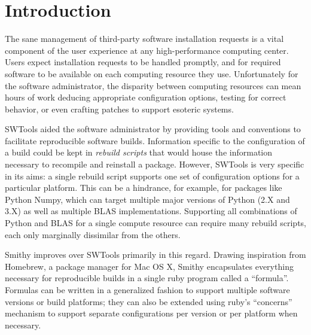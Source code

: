 \documentclass{acm_proc_article-sp}
\begin{document}



\section{Introduction}

The sane management of third-party software installation requests is a vital
component of the user experience at any high-performance computing center. Users
expect installation requests to be handled promptly, and for required software
to be available on each computing resource they use. Unfortunately for the
software administrator, the disparity between computing resources can mean hours
of work deducing appropriate configuration options, testing for correct
behavior, or even crafting patches to support esoteric systems.

SWTools\cite{swtools} aided the software administrator by providing tools and
conventions to facilitate reproducible software builds. Information specific to
the configuration of a build could be kept in \textit{rebuild scripts} that
would house the information necessary to recompile and reinstall a package.
However, SWTools is very specific in its aims: a single rebuild script supports
one set of configuration options for a particular platform. This can be a
hindrance, for example, for packages like Python Numpy, which can target
multiple major versions of Python (2.X and 3.X) as well as multiple BLAS
implementations.  Supporting all combinations of Python and BLAS for a single
compute resource can require many rebuild scripts, each only marginally
dissimilar from the others.

Smithy improves over SWTools primarily in this regard. Drawing inspiration from
Homebrew\cite{homebrew}, a package manager for Mac OS X, Smithy encapsulates
everything necessary for reproducible builds in a single ruby program called a
``formula''. Formulas can be written in a generalized fashion to support
multiple software versions or build platforms; they can also be extended using
ruby's ``concerns'' mechanism to support separate configurations per version or
per platform when necessary.
\end{document}

